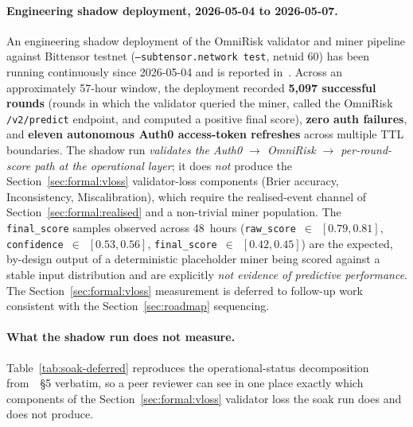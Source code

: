 \documentclass[11pt,a4paper]{article}
\begin{document}
\paragraph{Engineering shadow deployment, 2026-05-04 to 2026-05-07.} An engineering
shadow deployment of the OmniRisk validator and miner pipeline against Bittensor
testnet (\texttt{--subtensor.network test}, netuid 60) has been running continuously
since 2026-05-04 and is reported in~\cite{omnirisk2026soak}. Across an approximately
57-hour window, the deployment recorded \textbf{5{,}097 successful rounds} (rounds in
which the validator queried the miner, called the OmniRisk \texttt{/v2/predict}
endpoint, and computed a positive final score), \textbf{zero auth failures}, and
\textbf{eleven autonomous Auth0 access-token refreshes} across multiple TTL
boundaries. The shadow run \emph{validates the Auth0 \mbox{$\to$} OmniRisk \mbox{$\to$}
per-round-score path at the operational layer}; it does \emph{not} produce the
Section~\ref{sec:formal:vloss} validator-loss components (Brier accuracy,
Inconsistency, Miscalibration), which require the realised-event channel of
Section~\ref{sec:formal:realised} and a non-trivial miner population. The
\texttt{final\_score} samples observed across 48~hours
(\texttt{raw\_score}~$\in$~$[0.79, 0.81]$, \texttt{confidence}~$\in$~$[0.53, 0.56]$,
\texttt{final\_score}~$\in$~$[0.42, 0.45]$) are the expected, by-design output of a
deterministic placeholder miner being scored against a stable input distribution and
are explicitly \emph{not evidence of predictive performance}. The
Section~\ref{sec:formal:vloss} measurement is deferred to follow-up work consistent
with the Section~\ref{sec:roadmap} sequencing.

\paragraph{What the shadow run does not measure.} Table~\ref{tab:soak-deferred}
reproduces the operational-status decomposition from~\cite{omnirisk2026soak}~\S5
verbatim, so a peer reviewer can see in one place exactly which components of the
Section~\ref{sec:formal:vloss} validator loss the soak run does and does not produce.
\end{document}
